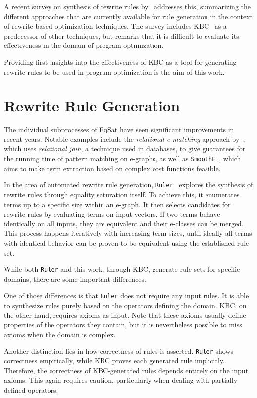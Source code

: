 A recent survey on synthesis of rewrite rules by~\cite{Hong_2024} addresses this, summarizing the different approaches that are currently available for rule generation in the context of rewrite-based optimization techniques. The survey includes KBC~\citep{10.1093/comjnl/34.1.2} as a predecessor of other techniques, but remarks that it is difficult to evaluate its effectiveness in the domain of program optimization. 

Providing first insights into the effectiveness of KBC as a tool for generating rewrite rules to be used in program optimization is the aim of this work.

\section{Rewrite Rule Generation}
The individual subprocesses of EqSat have seen significant improvements in recent years. Notable examples include the \emph{relational e-matching} approach by~\cite{Willsey_2022}, which uses \emph{relational join}, a technique used in databases, to give guarantees for the running time of pattern matching on e-graphs, as well as \texttt{SmoothE}~\citep{SmoothE}, which aims to make term extraction based on complex cost functions feasible. 

In the area of automated rewrite rule generation, \texttt{Ruler}~\citep{Ruler} explores the synthesis of rewrite rules through equality saturation itself. To achieve this, it enumerates terms up to a specific size within an e-graph. It then selects candidates for rewrite rules by evaluating terms on input vectors. If two terms behave identically on all inputs, they are equivalent and their e-classes can be merged. This process happens iteratively with increasing term sizes, until ideally all terms with identical behavior can be proven to be equivalent using the established rule set.

While both \texttt{Ruler} and this work, through KBC, generate rule sets for specific domains, there are some important differences.

One of those differences is that \texttt{Ruler} does not require any input rules. It is able to synthesize rules purely based on the operators defining the domain. KBC, on the other hand, requires axioms as input. Note that these axioms usually define properties of the operators they contain, but it is nevertheless possible to miss axioms when the domain is complex.

Another distinction lies in how correctness of rules is asserted. \texttt{Ruler} shows correctness empirically, while KBC proves each generated rule implicitly. Therefore, the correctness of KBC-generated rules depends entirely on the input axioms. This again requires caution, particularly when dealing with partially defined operators.

